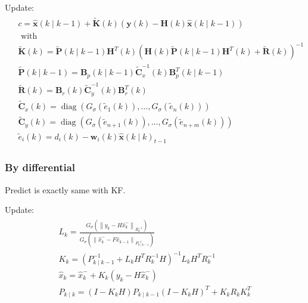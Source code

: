 \documentclass[dvipdfmx]{jsarticle}
\begin{document}
Update:
\begin{equation}\nonumber\label{Func.}\begin{aligned}
  \begin{aligned}
    &c=\widehat{\mathbf{x}}(k \mid k-1)+\widetilde{\mathbf{K}}(k)(\mathbf{y}(k)-\mathbf{H}(k) \widehat{\mathbf{x}}(k \mid k-1))\\
    &\text { with }\\
    &\tilde{\mathbf{K}}(k)=\tilde{\mathbf{P}}(k \mid k-1) \mathbf{H}^{T}(k)\left(\mathbf{H}(k) \tilde{\mathbf{P}}(k \mid k-1) \mathbf{H}^{T}(k)+\widetilde{\mathbf{R}}(k)\right)^{-1}\\
    &\widetilde{\mathbf{P}}(k \mid k-1)=\mathbf{B}_{p}(k \mid k-1) \tilde{\mathbf{C}}_{x}^{-1}(k) \mathbf{B}_{p}^{T}(k \mid k-1)\\
    &\widetilde{\mathbf{R}}(k)=\mathbf{B}_{r}(k) \widetilde{\mathbf{C}}_{y}^{-1}(k) \mathbf{B}_{r}^{T}(k)\\
    &\widetilde{\mathbf{C}}_{x}(k)=\operatorname{diag}\left(G_{\sigma}\left(\tilde{e}_{1}(k)\right), \ldots, G_{\sigma}\left(\widetilde{e}_{n}(k)\right)\right)\\
    &\widetilde{\mathbf{C}}_{y}(k)=\operatorname{diag}\left(G_{\sigma}\left(\widetilde{e}_{n+1}(k)\right), \ldots, G_{\sigma}\left(\widetilde{e}_{n+m}(k)\right)\right)\\
    &\widetilde{e}_{i}(k)=d_{i}(k)-\mathbf{w}_{i}(k) \widehat{\mathbf{x}}(k \mid k)_{t-1}
    \end{aligned}
\end{aligned}\end{equation}
\subsubsection*{By differential}
Predict is exactly same with KF.

Update:
\begin{equation}\nonumber\label{Func.}\begin{aligned}
  \begin{array}{c}
    L_{k}=\frac{G_{\sigma}\left(\left\|y_{k}-H \hat{x}_{k}^{-}\right\|_{R_{k}^{-1}}\right)}{G_{\sigma}\left(\left\|\hat{x}_{k}^{-}-F \hat{x}_{k-1}\right\|_{P_{k \mid k-1}^{-1}}\right)} \\
    K_{k}=\left(P_{k \mid k-1}^{-1}+L_{k} H^{T} R_{k}^{-1} H\right)^{-1} L_{k} H^{T} R_{k}^{-1} \\
    \hat{x}_{k}=\hat{x}_{k}^{-}+K_{k}\left(y_{k}-H \hat{x}_{k}^{-}\right) \\
    P_{k \mid k}=\left(I-K_{k} H\right) P_{k \mid k-1}\left(I-K_{k} H\right)^{T}+K_{k} R_{k} K_{k}^{T}
    \end{array}
\end{aligned}\end{equation}
\end{document}
